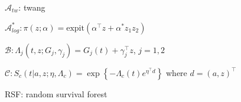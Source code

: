 \documentclass[11pt]{article}
\newcommand{\expit}{\text{expit}}
\begin{document}
\begin{table}[h]
\hskip 1in  $\mathcal{A}_{tw}$: twang 

\hskip 1in $\mathcal{A}^{*}_{log}: %
\pi(z ; \alpha)=\expit(\alpha^\top z + \alpha^{*}z_1z_2)$ 

\hskip 1in  $\mathcal{B}: %
 \Lambda_j(t, z; G_j, \gamma_j)=G_j(t) + \gamma_j^\top z$, $j=1, 2$

\hskip 1in  $\mathcal{C}: %
S_c(t| a, z ; \eta, \Lambda_c)=\exp\left\{-\Lambda_c(t)e^{\eta^\top d}\right\}$
where $d= (a, z)^\top$

\hskip 1in  RSF: random survival forest 

\end{table}
\end{document}
